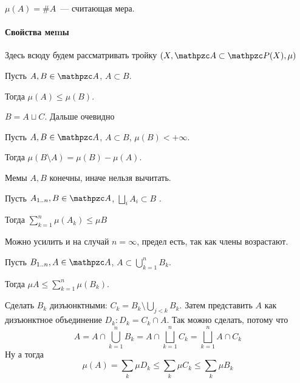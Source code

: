 \documentclass[draft, timbord]{longnotes}
\begin{document}
\begin{exmp}\label{exmp:meas::meas::cnt}
  $\mu(A) = \# A$~--- считающая мера. 
\end{exmp}

\paragraph{Свойства меmы}

Здесь всюду будем рассматривать тройку $(X, \alg \subset \pset (X), \mu)$

\begin{prop}\label{prop:meas::meas::monot}
  Пусть $A,B \in \alg$, $A \subset B$. \par Тогда $\mu(A) \leqslant \mu(B)$.
\end{prop}
\begin{lproof}
  $B = A \sqcup C$. Дальше очевидно
\end{lproof}
\begin{prop}\label{prop:meas::meas::diff}
  Пусть $A,B \in \alg$, $A \subset B$, $\mu(B) < +\infty$.  \par 
  Тогда $ \mu(B\setminus A) = \mu(B) - \mu(A)$.
\end{prop}
Мемы $A,B$ конечны, иначе нельзя вычитать.
\begin{prop}\label{prop:meas::meas::enfmont}
  Пусть $A_{1 \intrng n}, B \in \alg$, $\bigsqcup_i A_i \subset B$ . \par
  Тогда $\displaystyle\sum_{k=1}^n \mu(A_k) \leqslant \mu B$
\end{prop}
\begin{rem}\label{rem:meas::meas::enfmont}
  Можно усилить и на случай $n = \infty$, предел есть, так как члены возрастают.
\end{rem}

\begin{prop}\label{prop:meas::meas::semiadd}
  Пусть $B_{1 \intrng n}, A \in \alg$, $A \subset \displaystyle \bigcup_{k=1}^n B_k$. \par
  Тогда $\displaystyle\mu A \leqslant \sum_{k=1}^n \mu(B_k)$.
\end{prop}
\begin{lproof}
  Сделать $B_k$ дизъюнктными: $C_k = B_k \setminus \bigcup_{j <k} B_k$. Затем представить $A$ как
  дизъюнктное объединение $D_k \colon D_k = C_k \cap A$. Так можно сделать, потому что
  \[
    A = A \cap \bigcup_{k=1}^n B_k = A \cap \bigsqcup_{k=1}^n C_k = \bigsqcup_{k=1}^n A \cap C_k
  \]
  Ну а тогда
  \[
    \mu (A) = \sum_k \mu D_k \leqslant \sum_k \mu C_k \leqslant \sum_k \mu B_k
  \]
\end{lproof}
\end{document}
